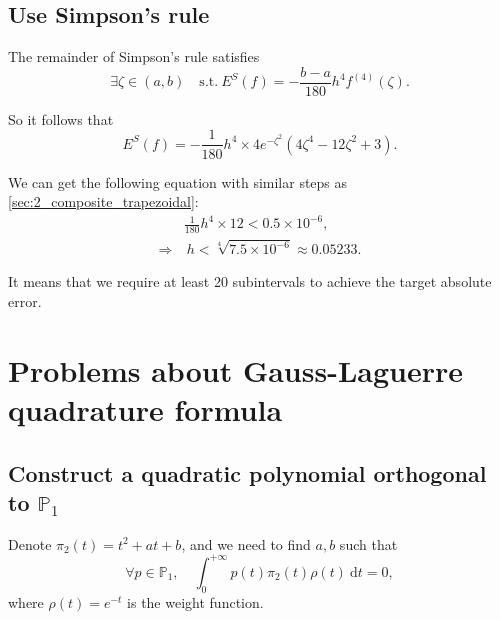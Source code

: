 \documentclass[a4paper]{article}
\begin{document}
\subsection{Use Simpson's rule}

The remainder of Simpson's rule satisfies
\begin{equation}
    \exists \zeta \in (a, b)\quad \mathrm{s.t.}\ E^S(f) = -\frac{b - a}{180}h^4f^{(4)}(\zeta).
    \label{eq:2_simpson_error}
\end{equation}

So it follows that 
\begin{equation}
    E^S(f) = -\frac{1}{180} h^4 \times 4e^{-\zeta^2}(4\zeta^4 - 12\zeta^2 + 3).
    \label{eq:2_simpson_error_final}
\end{equation}

We can get the following equation with similar steps as \cref{sec:2_composite_trapezoidal}:
\begin{equation}
    \begin{aligned}
        & \frac{1}{180}h^4 \times 12 < 0.5 \times 10^{-6}, \\
        \Rightarrow &\ h < \sqrt[4]{7.5 \times 10^{-6}} \approx 0.05233. 
    \end{aligned}
    \label{eq:2_simpson_error_final_approx}
\end{equation}

It means that we require at least 20 subintervals to achieve the target absolute error. 

\section{Problems about Gauss-Laguerre quadrature formula}

\subsection{Construct a quadratic polynomial orthogonal to $\mathbb{P}_1$}
\label{sec:3_1}

Denote $\pi_2(t) = t^2 + at + b$, and we need to find $a, b$ such that
\begin{equation}
    \forall p \in \mathbb{P}_1, \quad \int_0^{+\infty} p(t) \pi_2(t) \rho(t)\ \mathrm{d}t = 0,
    \label{eq:3_orthogonal}
\end{equation}
where $\rho(t) = e^{-t}$ is the weight function.
\end{document}
